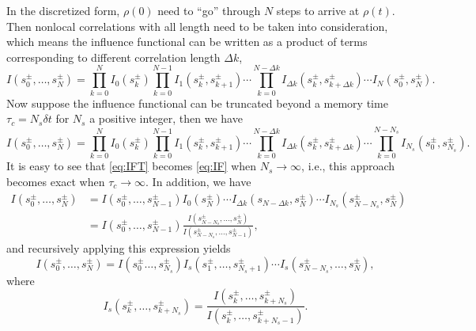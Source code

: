 \documentclass[11pt]{book}
\begin{document}
In the discretized form, \(\rho(0)\) need to ``go'' through \(N\) steps to
arrive at \(\rho(t)\). Then nonlocal correlations with all length need
to be taken into consideration, which means the influence functional
can be written as a product of terms corresponding to different
correlation length \(\Delta k\),
\begin{equation}
\label{eq:IF}
I(s_0^{\pm},\ldots,s_N^{\pm})=\prod_{k=0}^N I_0(s_k^{\pm})
\prod_{k=0}^{N-1}I_1(s_k^{\pm},s_{k+1}^{\pm})\cdots
\prod_{k=0}^{N-\Delta k}I_{\Delta k}(s_k^{\pm},s_{k+\Delta k}^{\pm})\cdots
I_N(s_0^{\pm},s_N^{\pm}).
\end{equation}
Now suppose the influence functional can be truncated beyond a memory
time \(\tau_c=N_s\delta t\) for \(N_s\) a positive integer, then we have
\begin{equation}
\label{eq:IFT}
I(s_0^{\pm},\ldots,s_N^{\pm})=\prod_{k=0}^N I_0(s_k^{\pm})
\prod_{k=0}^{N-1}I_1(s_k^{\pm},s_{k+1}^{\pm})\cdots
\prod_{k=0}^{N-\Delta k}I_{\Delta k}(s_k^{\pm},s_{k+\Delta k}^{\pm})\cdots
\prod_{k=0}^{N-N_s}I_{N_s}(s_0^{\pm},s_{N_s}^{\pm}).
\end{equation}
It is easy to see that \eqref{eq:IFT} becomes \eqref{eq:IF} when
\(N_s\to\infty\), i.e., this approach becomes exact when
\(\tau_c\to\infty\). In addition, we have
\begin{equation}
\begin{split}
I(s_0^{\pm},\ldots,s_N^{\pm})&=I(s_0^{\pm},\ldots,s_{N-1}^{\pm})
I_0(s_N^{\pm})\cdots I_{\Delta k}(s_{N-\Delta k},s_N^{\pm})\cdots
I_{N_s}(s_{N-N_s}^{\pm},s_N^{\pm})\\
&=I(s_0^{\pm},\ldots,s_{N-1}^{\pm})
\frac{I(s_{N-N_s}^{\pm},\ldots,s_{N}^{\pm})}{I(s_{N-N_s}^{\pm},\ldots,s_{N-1}^{\pm})},
\end{split}
\end{equation}
and recursively applying this expression yields
\begin{equation}
\label{eq:IFs}
I(s_0^{\pm},\ldots,s_N^{\pm})=I(s_0^{\pm}\ldots,s_{N_s}^{\pm})
I_s(s_1^{\pm},\ldots,s_{N_s+1}^{\pm})\cdots 
I_s(s_{N-N_s}^{\pm},\ldots,s_N^{\pm}),
\end{equation}
where
\begin{equation}
I_s(s_k^{\pm},\ldots,s_{k+N_s}^{\pm})=
\frac{I(s_k^{\pm},\ldots,s_{k+N_s}^{\pm})}{I(s_k^{\pm},\ldots,s_{k+N_s-1}^{\pm})}.
\end{equation}
\end{document}
